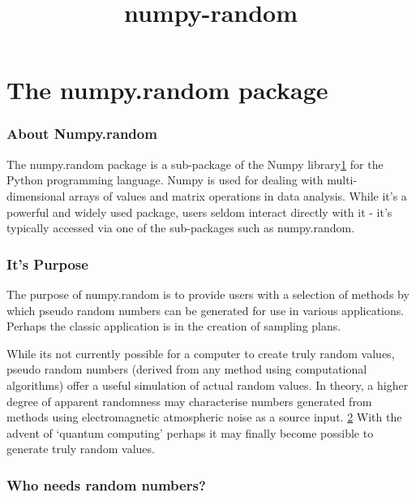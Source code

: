 \documentclass[11pt]{article}
\title{numpy-random}
\begin{document}
    
    
    \maketitle
    
    

    
    \section{The numpy.random package}\label{the-numpy.random-package}

    \subsubsection{About Numpy.random}\label{about-numpy.random}

The numpy.random package is a sub-package of the Numpy
library\href{http://www.numpy.org/}{1} for the Python programming
language. Numpy is used for dealing with multi-dimensional arrays of
values and matrix operations in data analysis. While it's a powerful and
widely used package, users seldom interact directly with it - it's
typically accessed via one of the sub-packages such as numpy.random.

    \subsubsection{It's Purpose}\label{its-purpose}

The purpose of numpy.random is to provide users with a selection of
methods by which pseudo random numbers can be generated for use in
various applications. Perhaps the classic application is in the creation
of sampling plans.

While its not currently possible for a computer to create truly random
values, pseudo random numbers (derived from any method using
computational algorithms) offer a useful simulation of actual random
values. In theory, a higher degree of apparent randomness may
characterise numbers generated from methods using electromagnetic
atmospheric noise as a source input.
\href{https://en.wikipedia.org/wiki/Random_number_generation}{2} With
the advent of `quantum computing' perhaps it may finally become possible
to generate truly random values.

    \subsubsection{Who needs random
numbers?}\label{who-needs-random-numbers}
\end{document}
